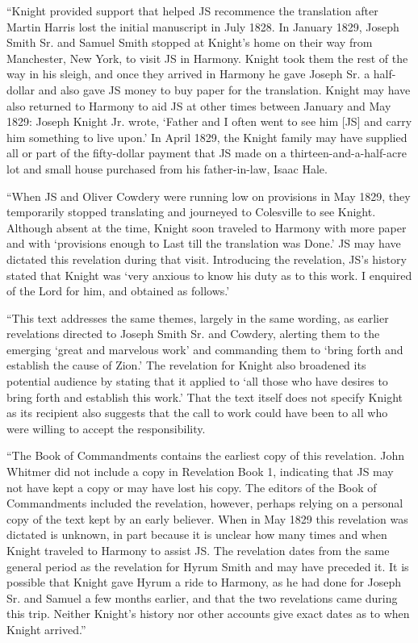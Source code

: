 			``Knight provided support that helped JS recommence the translation after Martin Harris lost the initial manuscript in July 1828. In January 1829, Joseph Smith Sr. and Samuel Smith stopped at Knight's home on their way from Manchester, New York, to visit JS in Harmony. Knight took them the rest of the way in his sleigh, and once they arrived in Harmony he gave Joseph Sr. a half-dollar and also gave JS money to buy paper for the translation. Knight may have also returned to Harmony to aid JS at other times between January and May 1829: Joseph Knight Jr. wrote, `Father and I often went to see him [JS] and carry him something to live upon.' In April 1829, the Knight family may have supplied all or part of the fifty-dollar payment that JS made on a thirteen-and-a-half-acre lot and small house purchased from his father-in-law, Isaac Hale.
			
			``When JS and Oliver Cowdery were running low on provisions in May 1829, they temporarily stopped translating and journeyed to Colesville to see Knight. Although absent at the time, Knight soon traveled to Harmony with more paper and with `provisions enough to Last till the translation was Done.' JS may have dictated this revelation during that visit. Introducing the revelation, JS's history stated that Knight was `very anxious to know his duty as to this work. I enquired of the Lord for him, and obtained as follows.'
			
			``This text addresses the same themes, largely in the same wording, as earlier revelations directed to Joseph Smith Sr. and Cowdery, alerting them to the emerging `great and marvelous work' and commanding them to `bring forth and establish the cause of Zion.' The revelation for Knight also broadened its potential audience by stating that it applied to `all those who have desires to bring forth and establish this work.' That the text itself does not specify Knight as its recipient also suggests that the call to work could have been to all who were willing to accept the responsibility.
			
			``The Book of Commandments contains the earliest copy of this revelation. John Whitmer did not include a copy in Revelation Book 1, indicating that JS may not have kept a copy or may have lost his copy. The editors of the Book of Commandments included the revelation, however, perhaps relying on a personal copy of the text kept by an early believer. When in May 1829 this revelation was dictated is unknown, in part because it is unclear how many times and when Knight traveled to Harmony to assist JS. The revelation dates from the same general period as the revelation for Hyrum Smith and may have preceded it. It is possible that Knight gave Hyrum a ride to Harmony, as he had done for Joseph Sr. and Samuel a few months earlier, and that the two revelations came during this trip. Neither Knight's history nor other accounts give exact dates as to when Knight arrived.''
			
